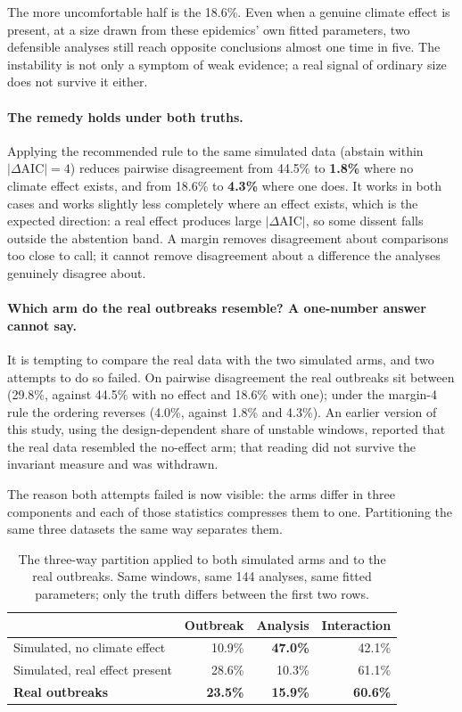 \documentclass[11pt,a4paper]{article}
\begin{document}
The more uncomfortable half is the 18.6\%. Even when a genuine climate effect is
present, at a size drawn from these epidemics' own fitted parameters, two
defensible analyses still reach opposite conclusions almost one time in five. The
instability is not only a symptom of weak evidence; a real signal of ordinary size
does not survive it either.

\paragraph{The remedy holds under both truths.} Applying the recommended rule to
the same simulated data (abstain within $|\Delta\mathrm{AIC}| = 4$) reduces
pairwise disagreement from 44.5\% to \textbf{1.8\%} where no climate effect
exists, and from 18.6\% to \textbf{4.3\%} where one does. It works in both cases
and works slightly less completely where an effect exists, which is the expected
direction: a real effect produces large $|\Delta\mathrm{AIC}|$, so some dissent
falls outside the abstention band. A margin removes disagreement about comparisons
too close to call; it cannot remove disagreement about a difference the analyses
genuinely disagree about.

\paragraph{Which arm do the real outbreaks resemble? A one-number answer cannot
say.} It is tempting to compare the real data with the two simulated arms, and two
attempts to do so failed. On pairwise disagreement the real outbreaks sit between
(29.8\%, against 44.5\% with no effect and 18.6\% with one); under the margin-4
rule the ordering reverses (4.0\%, against 1.8\% and 4.3\%). An earlier version of
this study, using the design-dependent share of unstable windows, reported that the
real data resembled the no-effect arm; that reading did not survive the invariant
measure and was withdrawn.

The reason both attempts failed is now visible: the arms differ in three
components and each of those statistics compresses them to one. Partitioning the
same three datasets the same way separates them.

\begin{table}[htbp]
\centering
\caption{The three-way partition applied to both simulated arms and to the real
outbreaks. Same windows, same 144 analyses, same fitted parameters; only the truth
differs between the first two rows.}
\begin{tabular}{lrrr}
\toprule
& Outbreak & Analysis & Interaction \\
\midrule
Simulated, no climate effect & 10.9\% & \textbf{47.0\%} & 42.1\% \\
Simulated, real effect present & 28.6\% & 10.3\% & 61.1\% \\
\midrule
\textbf{Real outbreaks} & \textbf{23.5\%} & \textbf{15.9\%} & \textbf{60.6\%} \\
\bottomrule
\end{tabular}
\end{table}
\end{document}

